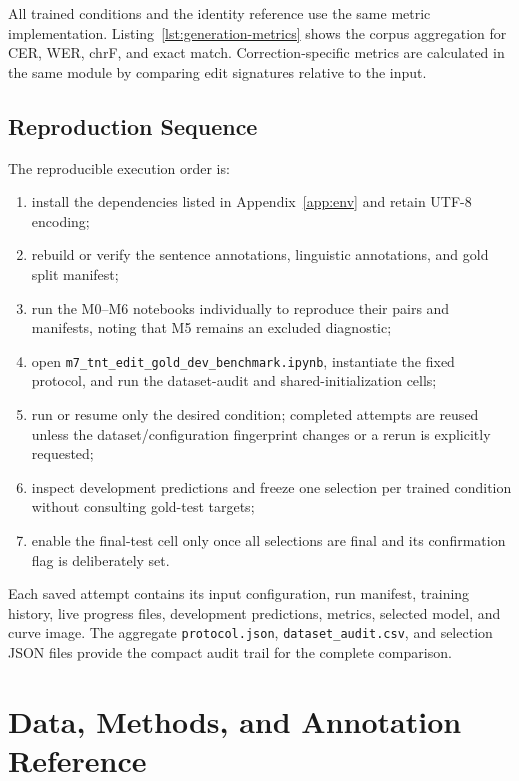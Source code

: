 \documentclass[12pt, a4paper, twoside, openany]{report}
\begin{document}
All trained conditions and the identity reference use the same metric implementation. Listing~\ref{lst:generation-metrics} shows the corpus aggregation for CER, WER, chrF, and exact match. Correction-specific metrics are calculated in the same module by comparing edit signatures relative to the input.



\section{Reproduction Sequence}

The reproducible execution order is:

\begin{enumerate}[leftmargin=1.1cm]
  \item install the dependencies listed in Appendix~\ref{app:env} and retain UTF-8 encoding;
  \item rebuild or verify the sentence annotations, linguistic annotations, and gold split manifest;
  \item run the M0--M6 notebooks individually to reproduce their pairs and manifests, noting that M5 remains an excluded diagnostic;
  \item open \texttt{m7\_tnt\_edit\_gold\_dev\_benchmark.ipynb}, instantiate the fixed protocol, and run the dataset-audit and shared-initialization cells;
  \item run or resume only the desired condition; completed attempts are reused unless the dataset/configuration fingerprint changes or a rerun is explicitly requested;
  \item inspect development predictions and freeze one selection per trained condition without consulting gold-test targets;
  \item enable the final-test cell only once all selections are final and its confirmation flag is deliberately set.
\end{enumerate}

Each saved attempt contains its input configuration, run manifest, training history, live progress files, development predictions, metrics, selected model, and curve image. The aggregate \texttt{protocol.json}, \texttt{dataset\_audit.csv}, and selection JSON files provide the compact audit trail for the complete comparison.

\chapter{Data, Methods, and Annotation Reference}
\label{app:data}
\end{document}
